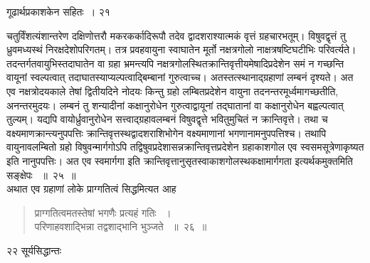 \documentclass[11pt, openany]{book}
\begin{document}
\newpage

 \hspace{3cm} गूढार्थप्रकाशकेन सहितः~। \hfill २१ 
\vspace{1cm}

\noindent चतुर्विंशत्यंशान्तरेण दक्षिणोत्तरौ मकरकर्कादिरूपौ तदेव द्वादशराश्यात्मकं वृत्तं ग्रहचारभतूम्। विषुवद्वृत्तं तु ध्रुवमध्यस्थं निरक्षदेशोपरिगतम्। तत्र प्रवहवायुना स्वाघातेन मूर्तो नक्षत्रगोलो नाक्षत्रषष्टिघटीभिः परिवर्त्यते। तदन्तर्गतवायुभिस्तदाघातेन वा ग्रहा भ्रमन्त्यपि नक्षत्रगोलस्थितक्रान्तिवृत्तीयमेषादिप्रदेशेन समं न गच्छन्ति वायूनां स्वल्पत्वात् तदाघातस्याप्यल्पत्वाद्बिम्बानां गुरुत्वाच्च। अतस्तत्स्थानाद्ग्रहाणां लम्बनं दृश्यते। अत एव नक्षत्रोदयकाले तेषां द्वितीयदिने नोदयः किन्तु ग्रहो लम्बितप्रदेशेन वायुना तदनन्तरमूर्ध्वमागच्छतीति, अनन्तरमुदयः। लम्बनं तु शन्यादीनां कक्षानुरोधेन गुरुत्वाद्वायूनां तद्घातानां वा कक्षानुरोधेन बह्वल्पत्वात् तुल्यम्। यद्यपि वायोर्ध्रुवानुरोधेन सत्त्वाद्ग्रहावलम्बनं विषुवद्वृत्ते भवितुमुचितं न क्रान्तिवृत्ते। तथा च वक्ष्यमाणक्रान्त्यनुपपत्तिः क्रान्तिवृत्तस्थद्वादशराशिभोगेन वक्ष्यमाणानां भगणानामनुपपत्तिश्च। तथापि वायुनावलम्बितो ग्रहो विषुवन्मार्गगोऽपि तद्विषुवप्रदेशासन्नक्रान्तिवृत्तप्रदेशेन ग्रहाकाशगोल एव स्वसमसूत्रेणाकृष्यत इति नानुपपत्तिः। अत एव स्वमार्गगा इति क्रान्तिवृत्तानुसृतस्वाकाशगोलस्थकक्षामार्गगता इत्यर्थकमुक्तमिति सङ्क्षेपः ~॥~२५~॥\\ \noindent अथात एव ग्रहाणां लोके प्राग्गतित्वं सिद्धमित्यत आह\textendash

 
 \begin{quote}
  {\ssi प्राग्गतित्वमतस्तेषां भगणैः प्रत्यहं गतिः ~।\\
परिणाहवशाद्भिन्ना तद्वशाद्भानि भुञ्जते ~॥~२६~॥}
\end{quote}
\newpage

\noindent २२ \hspace{4cm} सूर्यसिद्धान्तः
\vspace{1cm}
\end{document}
